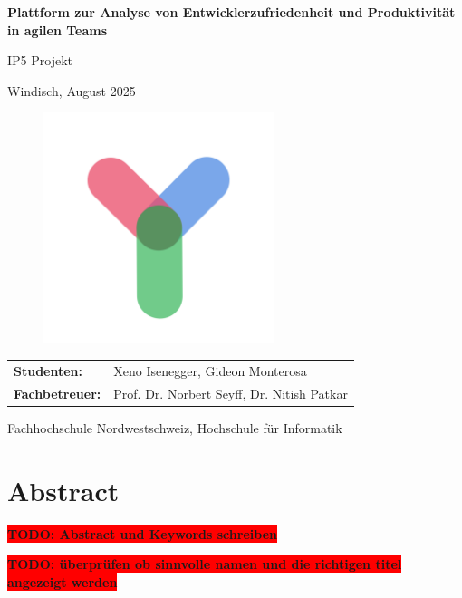 \documentclass[12pt,a4paper]{report}
\newcommand{\todo}[1]{\colorbox{red}{\textbf{TODO: #1}}\\}
\begin{document}
\begin{titlepage}
  \centering
  {\huge \textbf{Plattform zur Analyse von Entwicklerzufriedenheit und Produktivität in agilen Teams} \par}
  {\large IP5 Projekt \par}
  \vspace{0.5cm}
  {Windisch, August 2025 \par}
  \vspace{0.5cm}

  \begin{figure}[H]
    \centering
    \includegraphics[width=0.60\textwidth]{../figures/logo.png}
  \end{figure}

  \vfill
  \begin{tabular}{@{}ll@{}}
    \textbf{Studenten:}    & Xeno Isenegger, Gideon Monterosa \\
    \textbf{Fachbetreuer:} & Prof. Dr. Norbert Seyff, Dr. Nitish Patkar
  \end{tabular}

  {Fachhochschule Nordwestschweiz, Hochschule für Informatik \par}
\end{titlepage}

\chapter*{Abstract}
\todo{Abstract und Keywords schreiben}
\newpage

\todo{überprüfen ob sinnvolle namen und die richtigen titel angezeigt werden}
\tableofcontents
\newpage

\listoffigures
\newpage

\listoftables
\newpage
\end{document}
